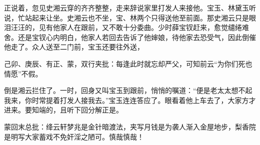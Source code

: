 \begin{parag}
    正说着，忽见史湘云穿的齐齐整整，走来辞说家里打发人来接他。宝玉、林黛玉听说，忙站起来让坐。史湘云也不坐，宝、林两个只得送他至前面。那史湘云只是眼泪汪汪的，见有他家人在跟前，又不敢十分委曲。少时薛宝钗赶来，愈觉缱绻难舍。还是宝钗心内明白，他家人若回去告诉了他婶娘，待他家去恐受气，因此倒催他走了。众人送至二门前，宝玉还要往外送，\begin{note}己卯、庚辰、有正、蒙，双行夹批：每逢此时就忘却严父，可知前云“为你们死也情愿”不假。\end{note}倒是湘云拦住了。一时，回身又叫宝玉到跟前，悄悄的嘱道：“便是老太太想不起我来，你时常提着打发人接我去。”宝玉连连答应了。眼看着他上车去了，大家方才进来。要知端的，且听下回分解正是。
\end{parag}


\begin{parag}
    \begin{note}蒙回末总批：绛云轩梦兆是金针暗渡法，夹写月钱是为袭人渐入金屋地步，梨香院是明写大家蓄戏不免奸淫之陋可。慎哉慎哉！\end{note}
\end{parag}

